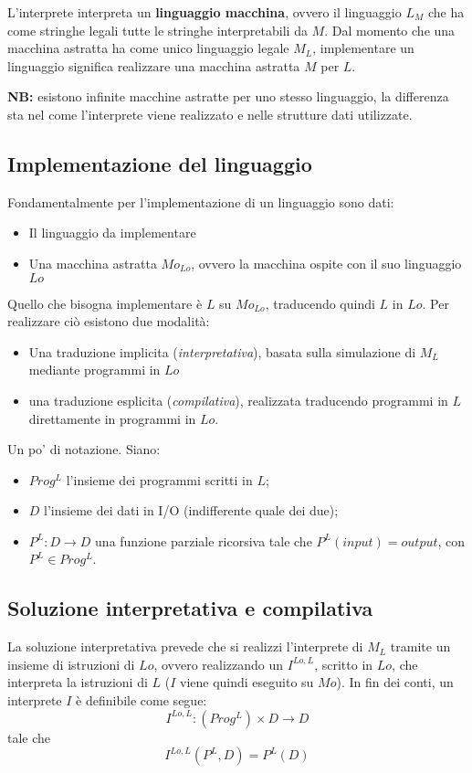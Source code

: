 \documentclass[a4paper, 10pt]{article}
\begin{document}
	L'interprete interpreta un \textbf{linguaggio macchina}, ovvero il linguaggio $L_M$ che ha come stringhe legali tutte le stringhe interpretabili da $M$. Dal momento che una macchina astratta ha come unico linguaggio legale $M_L$, implementare un linguaggio significa realizzare una macchina astratta $M$ per $L$.
	
	\noindent
	\textbf{NB:} esistono infinite macchine astratte per uno stesso linguaggio, la differenza sta nel come l'interprete viene realizzato e nelle strutture dati utilizzate.
	
	\subsection{Implementazione del linguaggio}
	
	Fondamentalmente per l'implementazione di un linguaggio sono dati:
	\begin{itemize}
		\item Il linguaggio da implementare
		\item Una macchina astratta $Mo_{Lo}$, ovvero la macchina ospite con il suo linguaggio $Lo$
	\end{itemize}
	Quello che bisogna implementare è $L$ su $Mo_{Lo}$, traducendo quindi $L$ in $Lo$. Per realizzare ciò esistono due modalità:
	\begin{itemize}
		\item Una traduzione implicita (\textit{interpretativa}), basata sulla simulazione di $M_L$ mediante programmi in $Lo$
		\item una traduzione esplicita (\textit{compilativa}), realizzata traducendo programmi in $L$ direttamente in programmi in $Lo$.
	\end{itemize}
	
	Un po' di notazione. Siano:
	\begin{itemize}
		\item $Prog^L$ l'insieme dei programmi scritti in $L$;
		\item $D$ l'insieme dei dati in I/O (indifferente quale dei due);
		\item $P^L:D\to D$ una funzione parziale ricorsiva tale che $P^L(input)=output$, con $P^L\in Prog^L$.
	\end{itemize}
	
	\subsection{Soluzione interpretativa e compilativa}
	La soluzione interpretativa prevede che si realizzi l'interprete di $M_L$ tramite un insieme di istruzioni di $Lo$, ovvero realizzando un $I^{Lo,L}$, scritto in $Lo$, che interpreta la istruzioni di $L$ ($I$ viene quindi eseguito su $Mo$).
	In fin dei conti, un interprete $I$ è definibile come segue:
	\[
	I^{Lo,L}:(Prog^L) \times D\to D
	\]
	tale che 
	\[
	I^{Lo,L}(P^L, D)=P^L(D)
	\]
	
\end{document}
